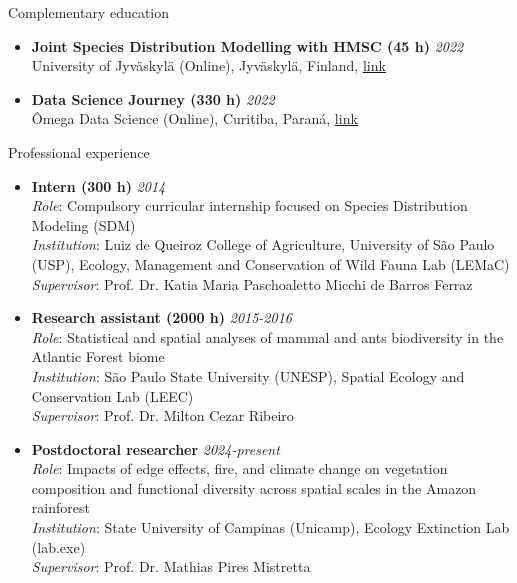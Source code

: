 \documentclass{resume}
\begin{document}
\begin{rSection}{Complementary education}
\begin{itemize}
\item {\bf Joint Species Distribution Modelling with HMSC (45 h)} \hfill {\em 2022}\\
University of Jyväskylä (Online), Jyväskylä, Finland, \href{https://www.helsinki.fi/en/researchgroups/statistical-ecology/software/hmsc}{\underline{link}}

\item {\bf Data Science Journey (330 h)} \hfill {\em 2022}\\
Ômega Data Science (Online), Curitiba, Paraná, \href{https://escola.omegadatascience.com.br}{\underline{link}}
\end{itemize} 

\end{rSection}


\begin{rSection}{Professional experience}
\begin{itemize}
\item {\bf Intern (300 h)} \hfill{\em 2014}\\
{\it Role}: Compulsory curricular internship focused on Species Distribution Modeling (SDM)\\
{\it Institution}: Luiz de Queiroz College of Agriculture, University of São Paulo (USP), Ecology, Management and Conservation of Wild Fauna Lab (LEMaC)\\
{\it Supervisor}: Prof. Dr. Katia Maria Paschoaletto Micchi de Barros Ferraz

\item {\bf Research assistant (2000 h)} \hfill{\em 2015-2016}\\
{\it Role}: Statistical and spatial analyses of mammal and ants biodiversity in the Atlantic Forest biome\\
{\it Institution}: São Paulo State University (UNESP), Spatial Ecology and Conservation Lab (LEEC)\\
{\it Supervisor}: Prof. Dr. Milton Cezar Ribeiro

\item {\bf Postdoctoral researcher} \hfill{\em 2024-present}\\
{\it Role}: Impacts of edge effects, fire, and climate change on vegetation composition and functional diversity across spatial scales in the Amazon rainforest\\
{\it Institution}: State University of Campinas (Unicamp), Ecology Extinction Lab (lab.exe)\\
{\it Supervisor}: Prof. Dr. Mathias Pires Mistretta
\end{itemize}
\end{rSection}
\end{document}
